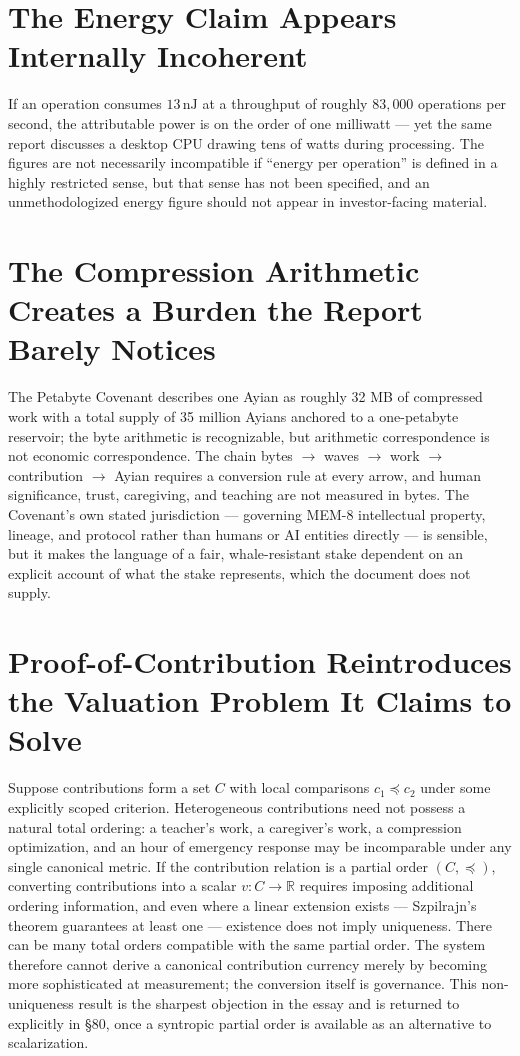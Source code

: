 \documentclass[12pt]{article}
\begin{document}
\section{The Energy Claim Appears Internally Incoherent}

If an operation consumes $13\,\mathrm{nJ}$ at a throughput of roughly $83{,}000$ operations per second, the attributable power is on the order of one milliwatt — yet the same report discusses a desktop CPU drawing tens of watts during processing. The figures are not necessarily incompatible if ``energy per operation'' is defined in a highly restricted sense, but that sense has not been specified, and an unmethodologized energy figure should not appear in investor-facing material.

\section{The Compression Arithmetic Creates a Burden the Report Barely Notices}

The Petabyte Covenant describes one Ayian as roughly 32 MB of compressed work with a total supply of 35 million Ayians anchored to a one-petabyte reservoir; the byte arithmetic is recognizable, but arithmetic correspondence is not economic correspondence. The chain bytes $\to$ waves $\to$ work $\to$ contribution $\to$ Ayian requires a conversion rule at every arrow, and human significance, trust, caregiving, and teaching are not measured in bytes. The Covenant's own stated jurisdiction — governing MEM-8 intellectual property, lineage, and protocol rather than humans or AI entities directly — is sensible, but it makes the language of a fair, whale-resistant stake dependent on an explicit account of what the stake represents, which the document does not supply.

\section{Proof-of-Contribution Reintroduces the Valuation Problem It Claims to Solve}

Suppose contributions form a set $C$ with local comparisons $c_1\preceq c_2$ under some explicitly scoped criterion. Heterogeneous contributions need not possess a natural total ordering: a teacher's work, a caregiver's work, a compression optimization, and an hour of emergency response may be incomparable under any single canonical metric. If the contribution relation is a partial order $(C,\preceq)$, converting contributions into a scalar $v:C\to\mathbb{R}$ requires imposing additional ordering information, and even where a linear extension exists — Szpilrajn's theorem guarantees at least one — existence does not imply uniqueness. There can be many total orders compatible with the same partial order. The system therefore cannot derive a canonical contribution currency merely by becoming more sophisticated at measurement; the conversion itself is governance. This non-uniqueness result is the sharpest objection in the essay and is returned to explicitly in \S80, once a syntropic partial order is available as an alternative to scalarization.
\end{document}
